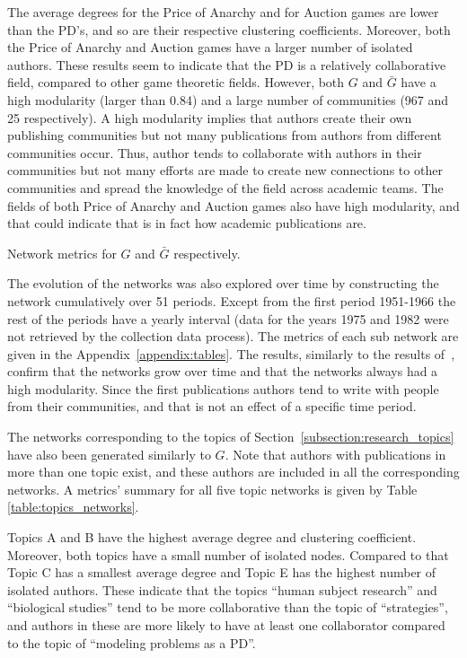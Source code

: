\documentclass{article}
\theoremstyle{definition}
\begin{document}
The average degrees for the Price of Anarchy and for Auction games are lower
than the PD's, and so are their respective clustering coefficients. Moreover,
both the Price of Anarchy and Auction games have a larger number of isolated
authors. These results seem to indicate that the PD is a relatively collaborative
field, compared to other game theoretic fields.
However, both \(G\) and \(\bar{G}\) have a high modularity (larger than 0.84) and a large number of
communities (967 and 25 respectively). A high modularity implies that authors create their own publishing
communities but not many publications from authors from different communities
occur. Thus, author tends to collaborate with authors in their communities but
not many efforts are made to create new connections to other communities and
spread the knowledge of the field across academic teams. The fields
of both Price of Anarchy and Auction games also have high modularity, and
that could indicate that is in fact how academic publications are.

\begin{table}[!hbtp]
    \centering
    \resizebox{\textwidth}{!}{
    }
    \caption{Network metrics for \(G\) and \(\bar{G}\) respectively.}
    \label{table:network_comparison}
\end{table}

The evolution of the networks was also explored over time by constructing the
network cumulatively over 51 periods. Except from the first period 1951-1966 the
rest of the periods have a yearly interval (data for the years 1975 and 1982
were not retrieved by the collection data process). The metrics of each sub
network are given in the Appendix~\ref{appendix:tables}.
The results, similarly to the results of~\cite{Liu2015}, confirm that the
networks grow over time and that the networks always had a high modularity.
Since the first publications authors tend to write with people from their
communities, and that is not an effect of a specific time period.

The networks corresponding to the topics of Section~\ref{subsection:research_topics} have
also been generated similarly to \(G\). Note that authors with publications in
more than one topic exist, and these authors are included in all the corresponding
networks. A metrics' summary for all five topic networks is given by Table
\ref{table:topics_networks}.

Topics A and B have the highest average degree and clustering coefficient.
Moreover, both topics have a small number of isolated nodes. Compared to that
Topic C has a smallest average degree and Topic E has the highest number of
isolated authors. These indicate that the topics ``human subject research'' and
``biological studies'' tend to be more collaborative than the topic of
``strategies'', and authors in these are more likely to have at least one
collaborator compared to the topic of ``modeling problems as a PD''.
\end{document}
